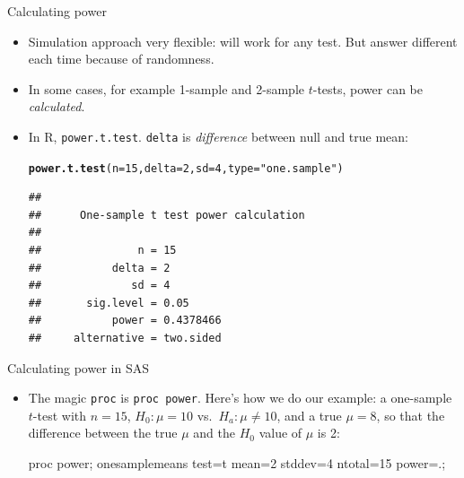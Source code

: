 \documentclass[unknownkeysallowed]{beamer}\usepackage[]{graphicx}\usepackage[]{color}
\makeatletter
\newcommand{\hlnum}[1]{\textcolor[rgb]{0.686,0.059,0.569}{#1}}%
\newcommand{\hlstr}[1]{\textcolor[rgb]{0.192,0.494,0.8}{#1}}%
\newcommand{\hlstd}[1]{\textcolor[rgb]{0.345,0.345,0.345}{#1}}%
\newcommand{\hlkwc}[1]{\textcolor[rgb]{0.333,0.667,0.333}{#1}}%
\newcommand{\hlkwd}[1]{\textcolor[rgb]{0.737,0.353,0.396}{\textbf{#1}}}%
\newenvironment{kframe}{%
 \def\at@end@of@kframe{}%
 \ifinner\ifhmode%
  \def\at@end@of@kframe{\end{minipage}}%
  \begin{minipage}{\columnwidth}%
 \fi\fi%
 \def\FrameCommand##1{\hskip\@totalleftmargin \hskip-\fboxsep
 \colorbox{shadecolor}{##1}\hskip-\fboxsep
     \hskip-\linewidth \hskip-\@totalleftmargin \hskip\columnwidth}%
 \MakeFramed {\advance\hsize-\width
   \@totalleftmargin\z@ \linewidth\hsize
   \@setminipage}}%
 {\par\unskip\endMakeFramed%
 \at@end@of@kframe}
\newenvironment{knitrout}{}{} %
\makeatother
\begin{document}
\begin{frame}[fragile]{Calculating power}
  
  \begin{itemize}
  \item Simulation approach very flexible: will work for any test. But
    answer different each time because of randomness.
  \item In some cases, for example 1-sample and 2-sample $t$-tests,
    power can be \emph{calculated}.
  \item In R, \texttt{power.t.test}. \texttt{delta} is
    \emph{difference} between null and true mean:
    
\begin{knitrout}
\color{fgcolor}\begin{kframe}
\begin{alltt}
\hlkwd{power.t.test}\hlstd{(}\hlkwc{n}\hlstd{=}\hlnum{15}\hlstd{,}\hlkwc{delta}\hlstd{=}\hlnum{2}\hlstd{,}\hlkwc{sd}\hlstd{=}\hlnum{4}\hlstd{,}\hlkwc{type}\hlstd{=}\hlstr{"one.sample"}\hlstd{)}
\end{alltt}
\begin{verbatim}
## 
##      One-sample t test power calculation 
## 
##               n = 15
##           delta = 2
##              sd = 4
##       sig.level = 0.05
##           power = 0.4378466
##     alternative = two.sided
\end{verbatim}
\end{kframe}
\end{knitrout}
  \end{itemize}
  
\end{frame}

\begin{frame}[fragile]{Calculating power in SAS}
  
  \begin{itemize}
  \item The magic \texttt{proc} is \texttt{proc power}. Here's how we
    do our example: a one-sample $t$-test with $n=15$, $H_0: \mu=10$
    vs.\ $H_a: \mu \ne 10$, and a true $\mu=8$, so that the difference
    between the true $\mu$ and the $H_0$ value of $\mu$ is 2:
    
    \begin{Sascode}[store=pb]
proc power;
  onesamplemeans
  test=t
  mean=2
  stddev=4
  ntotal=15
  power=.;
    \end{Sascode}
  \end{itemize}
  
\end{frame}
\end{document}
